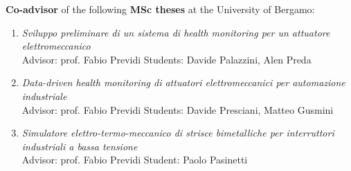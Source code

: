 \documentclass[10pt]{article}
\begin{document}
\textbf{Co-advisor} of the following \textbf{MSc theses} at the University of Bergamo:
\begin{enumerate}
	\setlength\itemsep{-3pt}
	\item \textit{Sviluppo preliminare di un sistema di health monitoring per un attuatore elettromeccanico}\\
	Advisor: prof. Fabio Previdi \hfill Students: Davide Palazzini, Alen Preda
	\item \textit{Data-driven health monitoring di attuatori elettromeccanici per automazione industriale}\\
	Advisor: prof. Fabio Previdi \hfill Students: Davide Presciani, Matteo Gusmini
	\item \textit{Simulatore elettro-termo-meccanico di strisce bimetalliche per interruttori industriali a bassa tensione}\\
	Advisor: prof. Fabio Previdi \hfill Student: Paolo Pasinetti
\end{enumerate}
\end{document}
